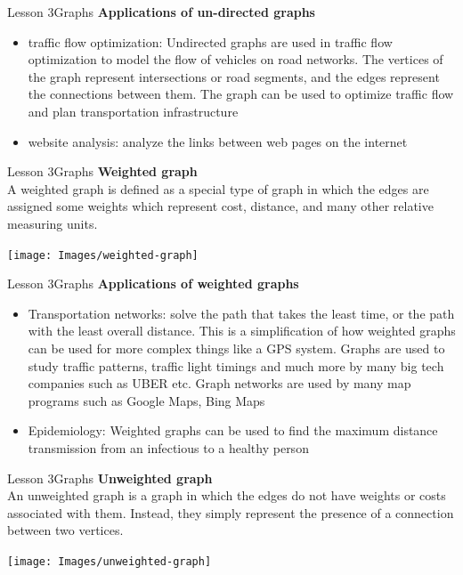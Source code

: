 \documentclass[aspectratio=1610]{beamer}
\begin{document}
\begin{frame}{Lesson 3}{Graphs}
\LARGE
\textbf{Applications of un-directed graphs}\\
\Large
\begin{itemize}
    \item traffic flow optimization: Undirected graphs are used in traffic flow optimization to model the flow of vehicles on road networks. The vertices of the graph represent intersections or road segments, and the edges represent the connections between them. The graph can be used to optimize traffic flow and plan transportation infrastructure
    \item website analysis: analyze the links between web pages on the internet
\end{itemize}
\end{frame}



\begin{frame}{Lesson 3}{Graphs}
\LARGE
\textbf{Weighted graph}\\
A weighted graph is defined as a special type of graph in which the
edges are assigned some weights which represent cost, distance, and
many other relative measuring units.
\begin{center}
\texttt{[image: Images/weighted-graph]}
\end{center}
\end{frame}


\begin{frame}{Lesson 3}{Graphs}
\LARGE
\textbf{Applications of weighted graphs}\\
\Large
\begin{itemize}
    \item Transportation networks: solve the path that takes the least time, or the path with the least overall distance. This is a simplification of how weighted graphs can be used for more complex things like a GPS system. Graphs are used to study traffic patterns, traffic light timings and much more by many big tech companies such as UBER etc. Graph networks are used by many map programs such as Google Maps, Bing Maps
    \item Epidemiology: Weighted graphs can be used to find the maximum distance transmission from an infectious to a healthy person
\end{itemize}
\end{frame}




\begin{frame}{Lesson 3}{Graphs}
\LARGE
\textbf{Unweighted graph}\\
An unweighted graph is a graph in which the edges do not have
weights or costs associated with them. Instead, they simply
represent the presence of a connection between two vertices.
\begin{center}
\texttt{[image: Images/unweighted-graph]}
\end{center}
\end{frame}
\end{document}
